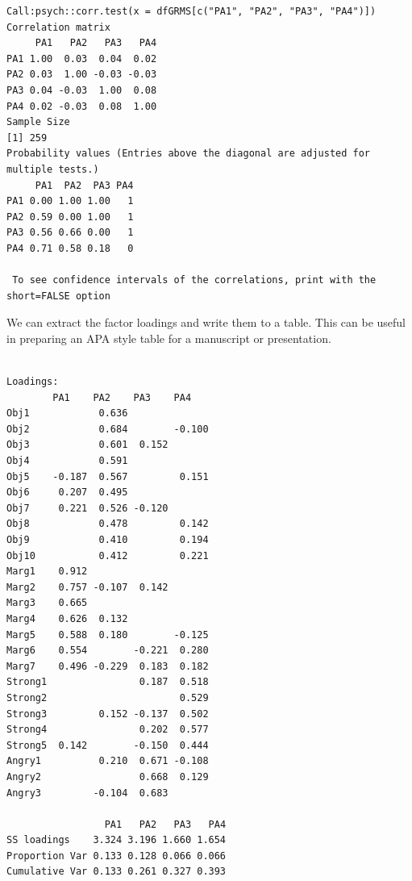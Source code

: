 \documentclass[
  english,
]{book}
\newenvironment{Shaded}{\begin{snugshade}}{\end{snugshade}}
\newcommand{\CommentTok}[1]{\textcolor[rgb]{0.56,0.35,0.01}{\textit{#1}}}
\newcommand{\DataTypeTok}[1]{\textcolor[rgb]{0.13,0.29,0.53}{#1}}
\newcommand{\DecValTok}[1]{\textcolor[rgb]{0.00,0.00,0.81}{#1}}
\newcommand{\KeywordTok}[1]{\textcolor[rgb]{0.13,0.29,0.53}{\textbf{#1}}}
\newcommand{\NormalTok}[1]{#1}
\newcommand{\OperatorTok}[1]{\textcolor[rgb]{0.81,0.36,0.00}{\textbf{#1}}}
\newcommand{\OtherTok}[1]{\textcolor[rgb]{0.56,0.35,0.01}{#1}}
\newcommand{\StringTok}[1]{\textcolor[rgb]{0.31,0.60,0.02}{#1}}
\begin{document}
\begin{verbatim}
Call:psych::corr.test(x = dfGRMS[c("PA1", "PA2", "PA3", "PA4")])
Correlation matrix 
     PA1   PA2   PA3   PA4
PA1 1.00  0.03  0.04  0.02
PA2 0.03  1.00 -0.03 -0.03
PA3 0.04 -0.03  1.00  0.08
PA4 0.02 -0.03  0.08  1.00
Sample Size 
[1] 259
Probability values (Entries above the diagonal are adjusted for multiple tests.) 
     PA1  PA2  PA3 PA4
PA1 0.00 1.00 1.00   1
PA2 0.59 0.00 1.00   1
PA3 0.56 0.66 0.00   1
PA4 0.71 0.58 0.18   0

 To see confidence intervals of the correlations, print with the short=FALSE option
\end{verbatim}

We can extract the factor loadings and write them to a table. This can be useful in preparing an APA style table for a manuscript or presentation.

\begin{Shaded}
\end{Shaded}

\begin{verbatim}

Loadings:
        PA1    PA2    PA3    PA4   
Obj1            0.636              
Obj2            0.684        -0.100
Obj3            0.601  0.152       
Obj4            0.591              
Obj5    -0.187  0.567         0.151
Obj6     0.207  0.495              
Obj7     0.221  0.526 -0.120       
Obj8            0.478         0.142
Obj9            0.410         0.194
Obj10           0.412         0.221
Marg1    0.912                     
Marg2    0.757 -0.107  0.142       
Marg3    0.665                     
Marg4    0.626  0.132              
Marg5    0.588  0.180        -0.125
Marg6    0.554        -0.221  0.280
Marg7    0.496 -0.229  0.183  0.182
Strong1                0.187  0.518
Strong2                       0.529
Strong3         0.152 -0.137  0.502
Strong4                0.202  0.577
Strong5  0.142        -0.150  0.444
Angry1          0.210  0.671 -0.108
Angry2                 0.668  0.129
Angry3         -0.104  0.683       

                 PA1   PA2   PA3   PA4
SS loadings    3.324 3.196 1.660 1.654
Proportion Var 0.133 0.128 0.066 0.066
Cumulative Var 0.133 0.261 0.327 0.393
\end{verbatim}
\end{document}
